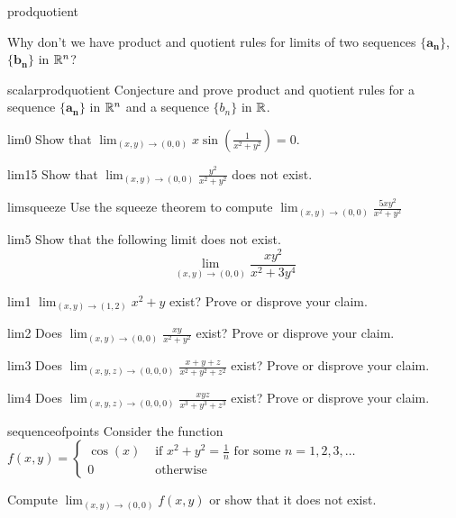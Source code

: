 \begin{problem}{prodquotient}

Why don't we have product and quotient rules for limits of two sequences $\{\bm{a_n}\}$, $\{\bm{b_n}\}$ in $\mathbb{R}^n$?

\end{problem}

\begin{problem}{scalarprodquotient}
Conjecture and prove product and quotient rules for a sequence $\{\bm{a_n}\}$ in $\mathbb{R}^n$ and a sequence $\{b_n\}$ in $\mathbb{R}$.
\end{problem}

\begin{problem}{lim0}
Show that $\lim_{(x,y) \to (0,0)} x\sin(\frac{1}{x^2 + y^2}) =0$.
\end{problem}

\begin{problem}{lim15}
Show that $\lim_{(x,y) \to (0,0)} \frac{y^2}{x^2 + y^2}$ does not exist.
\end{problem}

\begin{problem}{limsqueeze}
Use the squeeze theorem to compute $\lim_{(x,y) \to (0,0)} \frac{5xy^2}{x^2+y^2}$
\end{problem}

\begin{problem}{lim5}
Show that the following limit does not exist.
     $$\lim_{(x,y) \to (0,0)} \frac{xy^2}{x^2 + 3y^4}$$
\end{problem}

\begin{problem}{lim1}
$\lim_{(x,y) \to (1,2)} x^2+y$ exist? Prove or disprove your claim.
\end{problem}

\begin{problem}{lim2}
Does $\lim_{(x,y) \to (0,0)} \frac{xy}{x^2 + y^2}$ exist? Prove or disprove your claim.
\end{problem}

\begin{problem}{lim3}
Does $\lim_{(x,y,z) \to (0,0,0)} \frac{x + y+ z}{x^2 + y^2 +z^2}$ exist? Prove or disprove your claim.
\end{problem}

\begin{problem}{lim4}
Does $\lim_{(x,y,z) \to (0,0,0)} \frac{xyz}{x^3 + y^3 +z^3}$ exist? Prove or disprove your claim.
\end{problem}

\begin{problem}{sequenceofpoints}
Consider the function $f(x,y) = \left\{
		\begin{array}{ll}
			\cos(x) & \text{ if } x^2 + y^2 = \frac{1}{n} \text{ for some } n = 1, 2, 3, \dots \\
			0 & \text{ otherwise } 
		\end{array}
		\right.$
		
		Compute $\lim_{(x,y) \to (0,0)} f(x,y)$ or show that it does not exist.	
\end{problem}






